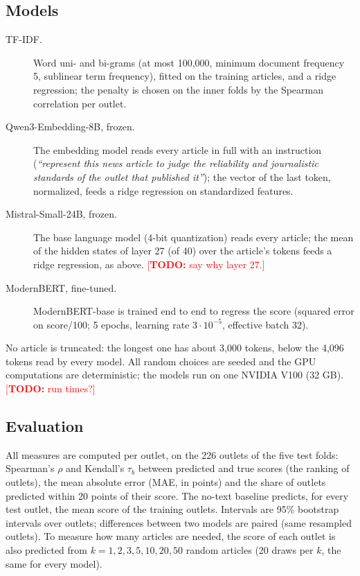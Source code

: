 \documentclass[11pt,a4paper]{article}
\newcommand{\todo}[1]{\textcolor{red}{[\textbf{TODO:} #1]}}
\begin{document}
\subsection{Models}
\begin{description}
  \item[TF-IDF.] Word uni- and bi-grams (at most 100,000, minimum document frequency 5, sublinear term frequency),
        fitted on the training articles, and a ridge regression; the penalty is chosen on the inner folds by the
        Spearman correlation per outlet.
  \item[Qwen3-Embedding-8B, frozen.] The embedding model \citep{zhang2025qwen3} reads every article in full with an
        instruction (\emph{``represent this news article to judge the reliability and journalistic standards of the
        outlet that published it''}); the vector of the last token, normalized, feeds a ridge regression on
        standardized features.
  \item[Mistral-Small-24B, frozen.] The base language model \citep{mistralsmall} (4-bit quantization) reads every
        article; the mean of the hidden states of layer 27 (of 40) over the article's tokens feeds a ridge
        regression, as above. \todo{say why layer 27.}
  \item[ModernBERT, fine-tuned.] ModernBERT-base \citep{warner2024modernbert} is trained end to end to regress the
        score (squared error on score/100; 5 epochs, learning rate $3\cdot10^{-5}$, effective batch 32).
\end{description}
No article is truncated: the longest one has about 3,000 tokens, below the 4,096 tokens read by every model.
All random choices are seeded and the GPU computations are deterministic; the models run on one NVIDIA V100 (32 GB).
\todo{run times?}

\subsection{Evaluation}
All measures are computed per outlet, on the 226 outlets of the five test folds: Spearman's $\rho$ and Kendall's
$\tau_b$ between predicted and true scores (the ranking of outlets), the mean absolute error (MAE, in points) and the
share of outlets predicted within 20 points of their score. The no-text baseline predicts, for every test outlet, the
mean score of the training outlets. Intervals are 95\% bootstrap intervals over outlets; differences between two
models are paired (same resampled outlets). To measure how many articles are needed, the score of each outlet is
also predicted from $k = 1, 2, 3, 5, 10, 20, 50$ random articles (20 draws per $k$, the same for every model).
\end{document}
